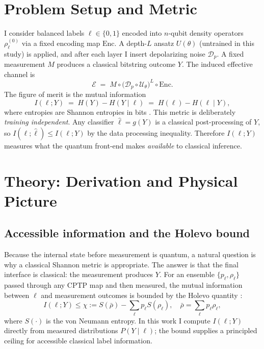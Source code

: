 \documentclass[]{ieeeaccess}
\newcommand{\MI}{I(\ell;Y)}
\begin{document}
\section{Problem Setup and Metric}
I consider balanced labels $\ell\in\{0,1\}$ encoded into $n$-qubit density operators $\rho_\ell^{(0)}$ via a fixed encoding map $\mathrm{Enc}$. A depth-$L$ ansatz $U(\theta)$ (untrained in this study) is applied, and after each layer I insert depolarizing noise $\mathcal{D}_p$. A fixed measurement $M$ produces a classical bitstring outcome $Y$. The induced effective channel is
\begin{equation}
\mathcal{E} \;=\; M \circ \bigl(\mathcal{D}_p\circ\mathcal{U}_\theta\bigr)^L \circ \mathrm{Enc}.
\end{equation}
The figure of merit is the mutual information
\begin{equation}
\MI \;=\; H(Y)-H(Y\mid \ell)
\;=\; H(\ell)-H(\ell\mid Y),
\end{equation}
where entropies are Shannon entropies in bits \cite{ref3}. This metric is deliberately \emph{training independent}. Any classifier $\hat{\ell}=g(Y)$ is a classical post-processing of $Y$, so $I(\ell;\hat{\ell})\le \MI$ by the data processing inequality. Therefore $\MI$ measures what the quantum front-end makes \emph{available} to classical inference.

\section{Theory: Derivation and Physical Picture}
\subsection{Accessible information and the Holevo bound}
Because the internal state before measurement is quantum, a natural question is why a classical Shannon metric is appropriate. The answer is that the final interface is classical: the measurement produces $Y$. For an ensemble $\{p_\ell,\rho_\ell\}$ passed through any CPTP map and then measured, the mutual information between $\ell$ and measurement outcomes is bounded by the Holevo quantity \cite{ref2,ref1}:
\begin{equation}
\MI \le \chi := S(\bar{\rho})-\sum_\ell p_\ell S(\rho_\ell),\quad \bar{\rho}=\sum_\ell p_\ell \rho_\ell,
\end{equation}
where $S(\cdot)$ is the von Neumann entropy. In this work I compute $\MI$ directly from measured distributions $P(Y\mid \ell)$; the bound supplies a principled ceiling for accessible classical label information.
\end{document}
